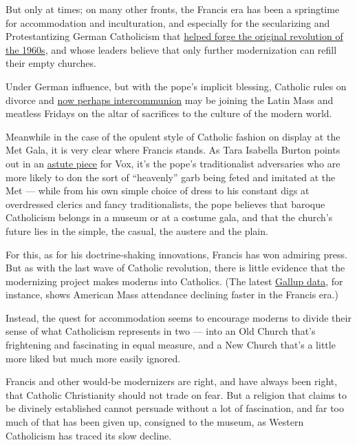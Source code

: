 But only at times; on many other fronts, the Francis era has been a
springtime for accommodation and inculturation, and especially for the
secularizing and Protestantizing German Catholicism that
\href{https://www.wsj.com/articles/germanys-liberal-bishops-gain-influence-under-pope-francis-1525431601}{helped
forge the original revolution of the 1960s}, and whose leaders believe
that only further modernization can refill their empty churches.

Under German influence, but with the pope's implicit blessing, Catholic
rules on divorce and
\href{https://cruxnow.com/global-church/2018/05/03/pope-wants-germans-to-find-unanimous-solution-on-intercommunion/}{now
perhaps intercommunion} may be joining the Latin Mass and meatless
Fridays on the altar of sacrifices to the culture of the modern world.

Meanwhile in the case of the opulent style of Catholic fashion on
display at the Met Gala, it is very clear where Francis stands. As Tara
Isabella Burton points out in an
\href{https://www.vox.com/2018/5/7/17306388/the-real-controversy-at-the-heart-of-catholic-fashion}{astute
piece} for Vox, it's the pope's traditionalist adversaries who are more
likely to don the sort of ``heavenly'' garb being feted and imitated at
the Met --- while from his own simple choice of dress to his constant
digs at overdressed clerics and fancy traditionalists, the pope believes
that baroque Catholicism belongs in a museum or at a costume gala, and
that the church's future lies in the simple, the casual, the austere and
the plain.

For this, as for his doctrine-shaking innovations, Francis has won
admiring press. But as with the last wave of Catholic revolution, there
is little evidence that the modernizing project makes moderns into
Catholics. (The latest
\href{http://news.gallup.com/poll/232226/church-attendance-among-catholics-resumes-downward-slide.aspx}{Gallup
data}, for instance, shows American Mass attendance declining faster in
the Francis era.)

Instead, the quest for accommodation seems to encourage moderns to
divide their sense of what Catholicism represents in two --- into an Old
Church that's frightening and fascinating in equal measure, and a New
Church that's a little more liked but much more easily ignored.

Francis and other would-be modernizers are right, and have always been
right, that Catholic Christianity should not trade on fear. But a
religion that claims to be divinely established cannot persuade without
a lot of fascination, and far too much of that has been given up,
consigned to the museum, as Western Catholicism has traced its slow
decline.

